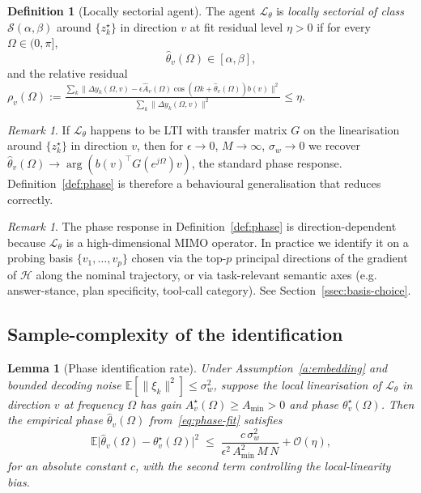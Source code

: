 \documentclass[11pt,a4paper]{article}
\newtheorem{lemma}[theorem]{Lemma}
\theoremstyle{definition}
\newtheorem{definition}[theorem]{Definition}
\theoremstyle{remark}
\newtheorem{remark}[theorem]{Remark}
\newcommand{\E}{\mathbb{E}}
\newcommand{\T}{^{\!\top}}
\newcommand{\agent}{\mathcal{L}_{\theta}}
\newcommand{\obs}{\mathcal{H}}
\newcommand{\sectorial}[2]{\mathcal{S}(#1,#2)}
\begin{document}
\begin{definition}[Locally sectorial agent]\label{def:loc-sectorial}
The agent $\agent$ is \emph{locally sectorial of class}
$\sectorial{\alpha}{\beta}$ around $\{z_{k}^{\star}\}$ in direction $v$ at
fit residual level $\eta>0$ if for every $\Omega\in(0,\pi]$,
\begin{equation}\label{eq:loc-sec}
\widehat\theta_{v}(\Omega)\in[\alpha,\beta],
\end{equation}
and the relative residual
$\rho_{v}(\Omega) := \frac{\sum_{k}\|\Delta y_{k}(\Omega,v)
- \epsilon\widehat A_{v}(\Omega)\cos(\Omega k+\widehat\theta_{v}(\Omega))b(v)\|^{2}}
{\sum_{k}\|\Delta y_{k}(\Omega,v)\|^{2}}\le\eta$.
\end{definition}

\begin{remark}\label{r:reduction-LTI}
If $\agent$ happens to be LTI with transfer matrix $G$ on the linearisation
around $\{z_{k}^{\star}\}$ in direction $v$, then for $\epsilon\to 0$,
$M\to\infty$, $\sigma_{w}\to 0$ we recover
$\widehat\theta_{v}(\Omega)\to\arg(b(v)\T G(e^{j\Omega})v)$, the standard
phase response.  Definition~\ref{def:phase} is therefore a behavioural
generalisation that reduces correctly.
\end{remark}

\begin{remark}\label{r:choice-of-direction}
The phase response in Definition~\ref{def:phase} is direction-dependent
because $\agent$ is a high-dimensional MIMO operator.  In practice we
identify it on a probing basis $\{v_{1},\dots,v_{p}\}$ chosen via the
top-$p$ principal directions of the gradient of $\obs$ along the nominal
trajectory, or via task-relevant semantic axes (e.g. answer-stance, plan
specificity, tool-call category).  See Section~\ref{ssec:basis-choice}.
\end{remark}

\subsection{Sample-complexity of the identification}\label{ssec:sample-complexity}

\begin{lemma}[Phase identification rate]\label{l:rate}
Under Assumption~\ref{a:embedding} and bounded decoding noise
$\E[\|\xi_{k}\|^{2}]\le\sigma_{w}^{2}$, suppose the local linearisation
of $\agent$ in direction $v$ at frequency $\Omega$ has gain
$A_{v}^{\star}(\Omega)\ge A_{\min}>0$ and phase
$\theta_{v}^{\star}(\Omega)$.  Then the empirical phase
$\widehat\theta_{v}(\Omega)$ from~\eqref{eq:phase-fit} satisfies
\[
\E\bigl|\widehat\theta_{v}(\Omega)-\theta_{v}^{\star}(\Omega)\bigr|^{2}
\;\le\; \frac{c\,\sigma_{w}^{2}}{\epsilon^{2}\,A_{\min}^{2}\,M\,N}+\mathcal{O}(\eta),
\]
for an absolute constant $c$, with the second term controlling the
local-linearity bias.
\end{lemma}
\end{document}
